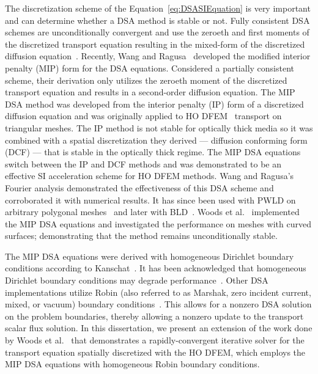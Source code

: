 \documentclass[12pt,letterpaper]{article}
\begin{document}
The discretization scheme of the Equation~\ref{eq:DSASIEquation} is very important and can determine whether a DSA method is stable or not. Fully consistent DSA schemes are unconditionally convergent and use the zeroeth and first moments of the discretized transport equation resulting in the mixed-form of the discretized diffusion equation~\cite{WarsaFullyConsistentLDDSA}. Recently, Wang and Ragusa~\cite{WangRagusaDSA} developed the modified interior penalty (MIP) form for the DSA equations. Considered a partially consistent scheme, their derivation only utilizes the zeroeth moment of the discretized transport equation and results in a second-order diffusion equation. The MIP DSA method was developed from the interior penalty (IP) form of a discretized diffusion equation and was originally applied to HO DFEM \SN\ transport on triangular meshes. The IP method is not stable for optically thick media so it was combined with a spatial discretization they derived --- diffusion conforming form (DCF) --- that is stable in the optically thick regime. The MIP DSA equations switch between the IP and DCF methods and was demonstrated to be an effective SI acceleration scheme for HO DFEM methods. Wang and Ragusa's Fourier analysis demonstrated the effectiveness of this DSA scheme and corroborated it with numerical results. It has since been used with PWLD on arbitrary polygonal meshes~\cite{TurcksinDiscontinuousDSA} and later with BLD~\cite{TurcksinDSABLD}. Woods et al.~\cite{WoodsDSA} implemented the MIP DSA equations and investigated the performance on meshes with curved surfaces; demonstrating that the method remains unconditionally stable.

The MIP DSA equations were derived with homogeneous Dirichlet boundary conditions according to Kanschat~\cite{KanschatDGViscousIncompressFlow}. It has been acknowledged that homogeneous Dirichlet boundary conditions may degrade performance~\cite{WangDissertation}. Other DSA implementations utilize Robin (also referred to as Marshak, zero incident current, mixed, or vacuum) boundary conditions~\cite{WarsaFullyConsistentLDDSA,AdamsDSADFEM}. This allows for a nonzero DSA solution on the problem boundaries, thereby allowing a nonzero update to the transport scalar flux solution. In this dissertation, we present an extension of the work done by Woods et al.~\cite{WoodsDSA} that demonstrates a rapidly-convergent iterative solver for the transport equation spatially discretized with the HO DFEM, which employs the MIP DSA equations with homogeneous Robin boundary conditions.
\end{document}
